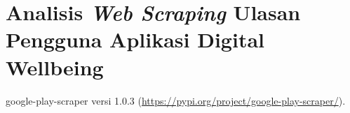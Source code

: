 \chapter{Analisis \textit{Web Scraping} Ulasan Pengguna Aplikasi Digital Wellbeing}
\label{chpt:web_scraping}

google-play-scraper versi 1.0.3 (\url{https://pypi.org/project/google-play-scraper/}).
